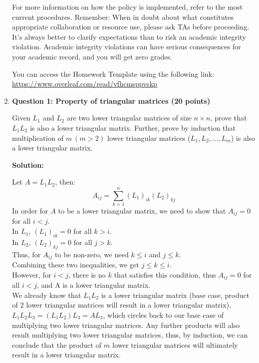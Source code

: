 \documentclass[11pt,letterpaper]{article}
\begin{document}
\begin{enumerate}
{\begin{minipage}{0.95\textwidth}
\begin{enumerate}
    For more information on how the policy is implemented, refer to the most current procedures. Remember: When in doubt about what constitutes appropriate collaboration or resource use, please ask TAs before proceeding. It's always better to clarify expectations than to risk an academic integrity violation. Academic integrity violations can have serious consequences for your academic record, and you will get zero grades.
\end{enumerate}



You can access the Homework Template using the following link: \url{https://www.overleaf.com/read/vfhcmsppvskp}
\end{minipage}}

\clearpage
\item[] \textbf{Question 1: Property of triangular matrices (20 points)} 

Given $L_1$ and $L_2$ are two lower triangular matrices of size $n\times n$, prove that $L_1L_2$ is also a lower triangular matrix. Further, prove by induction that multiplication of $m\,(m>2)$ lower triangular matrices ($L_1, L_2,..., L_m$) is also a lower triangular matrix.

\textbf{Solution:}  

Let $A = L_1L_2$, then:
\[
A_{ij} = \sum_{k=1}^{n} (L_1)_{ik} (L_2)_{kj}
\]
In order for $A$ to be a lower triangular matrix, we need to show that $A_{ij} = 0$ 
for all $i < j$.\\
In $L_1$, $(L_1)_{ik} = 0$ for all $k > i$.\\
In $L_2$, $(L_2)_{kj} = 0$ for all $j > k$.\\
Thus, for $A_{ij}$ to be non-zero, we need $k \leq i$ and $j \leq k$.\\
Combining these two inequalities, we get $j \leq k \leq i$.\\
However, for $i < j$, there is no $k$ that satisfies this condition, thus $A_{ij} = 0$ 
for all $i < j$, and A is a lower triangular matrix.\\

We already know that $L_1L_2$ is a lower triangular matrix (base case, product 
of 2 lower triangular matrices will result in a lower triangular matrix). $L_1L_2L_3 = (L_1L_2)L_3 = AL_3$,
which circles back to our base case of multiplying two lower triangular matrices.
Any further products will also result multiplying two lower triangular matrices, 
thus, by induction, we can conclude that the product of $m$ lower triangular 
matrices will ultimately result in a lower triangular matrix. 


\end{enumerate}
\end{document}
